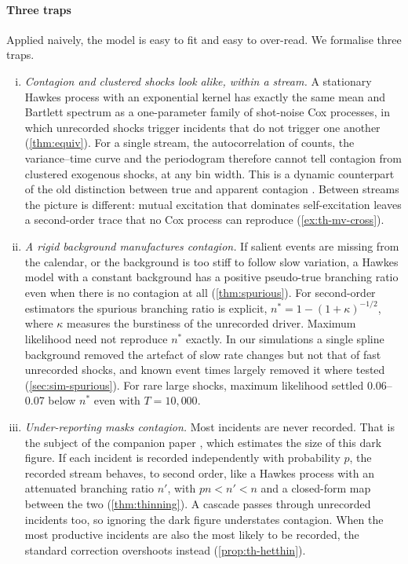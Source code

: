 \paragraph{Three traps}
Applied naively, the model is easy to fit and easy to over-read. We
formalise three traps.
\begin{enumerate}[(i),leftmargin=2.2em]
  \item \emph{Contagion and clustered shocks look alike, within a stream.} A
  stationary Hawkes process with an exponential kernel has exactly the same mean
  and Bartlett spectrum as a one-parameter family of shot-noise Cox processes, in
  which unrecorded shocks trigger incidents that do not trigger one another
  (\cref{thm:equiv}). For a single stream, the autocorrelation of counts, the
  variance--time curve and the periodogram therefore cannot tell contagion from
  clustered exogenous shocks, at any bin width. This is a dynamic counterpart of
  the old distinction between true and apparent contagion \citep{feller1943}.
  Between streams the picture is different: mutual excitation that dominates
  self-excitation leaves a second-order trace that no Cox process can reproduce
  (\cref{ex:th-mv-cross}).
  \item \emph{A rigid background manufactures contagion.} If salient events
  are missing from the calendar, or the background is too stiff to follow
  slow variation, a Hawkes model with a constant background has a positive
  pseudo-true branching ratio even when there is no contagion at all
  (\cref{thm:spurious}). For second-order estimators the spurious branching
  ratio is explicit, $n^*=1-(1+\kappa)^{-1/2}$, where $\kappa$ measures the
  burstiness of the unrecorded driver. Maximum likelihood need not reproduce
  $n^*$ exactly. In our simulations a single spline background removed the
  artefact of slow rate changes but not that of fast unrecorded shocks, and
  known event times largely removed it where tested (\cref{sec:sim-spurious}).
  For rare large shocks, maximum likelihood settled 0.06--0.07 below $n^*$ even
  with $T=10{,}000$.
  \item \emph{Under-reporting masks contagion.} Most incidents are never
  recorded. That is the subject of the companion paper
  \citep{kornsteinlab2026darkfigure}, which estimates the size of this dark
  figure. If each incident is recorded independently with probability $p$,
  the recorded stream behaves, to second order, like a Hawkes process with
  an attenuated branching ratio $n'$, with $pn<n'<n$ and a closed-form map
  between the two (\cref{thm:thinning}). A cascade passes through unrecorded
  incidents too, so ignoring the dark figure understates contagion. When the
  most productive incidents are also the most likely to be recorded, the
  standard correction overshoots instead (\cref{prop:th-hetthin}).
\end{enumerate}
